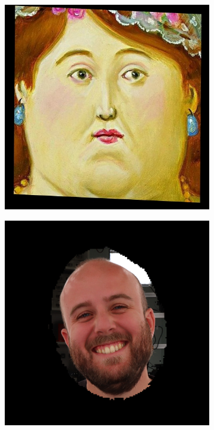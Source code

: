 \begin{figure}
\begin{subfigure}{0.22\linewidth}
        \includegraphics[width=\textwidth]{Figures/failed/stross/textures/00059_style.jpg}
	\end{subfigure}
    \begin{subfigure}{0.22\linewidth}
        \includegraphics[width=\textwidth]{Figures/failed/stross/textures/masked/masked_head_8-8-5-1_123851_791.png}

\end{subfigure}
\end{figure}
